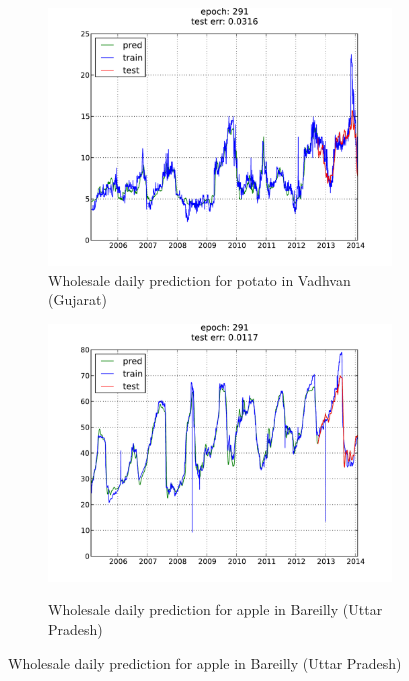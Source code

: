 \begin{figure}[H]
    \centering
        \begin{subfigure}[b]{.45\linewidth}
        \centering
        \includegraphics[width=\textwidth]{img/ffnn/1.pdf}
        \caption{Wholesale daily prediction for potato in Vadhvan (Gujarat)}
        \label{subfig:ffnn_pred_1}
        \end{subfigure}
        \quad
        \begin{subfigure}[b]{.45\linewidth}
        \centering
        \includegraphics[width=\textwidth]{img/ffnn/2.pdf}
        \label{subfig:ffnn_pred_2}
        \caption{Wholesale daily prediction for apple in Bareilly (Uttar Pradesh)}
        \end{subfigure}
\end{figure}

